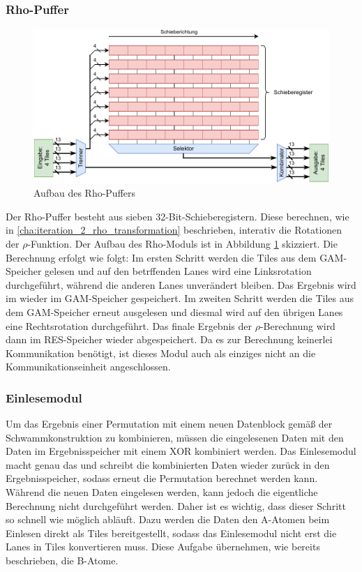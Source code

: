 \subsubsection{Rho-Puffer}
\begin{figure}
	\center
	\includegraphics{images/Rho-Aufbau.pdf}
	\caption{Aufbau des Rho-Puffers}
	\label{fig:rho_aufbau_iteration_3}
\end{figure}
Der Rho-Puffer besteht aus sieben 32-Bit-Schieberegistern. Diese berechnen, wie in \ref{cha:iteration_2_rho_transformation} beschrieben,
interativ die Rotationen der $\rho$-Funktion. Der Aufbau des Rho-Moduls ist in Abbildung \ref{fig:rho_aufbau_iteration_3} skizziert.
Die Berechnung erfolgt wie folgt: Im ersten Schritt werden die Tiles aus dem GAM-Speicher gelesen und auf den betrffenden Lanes
wird eine Linksrotation durchgeführt, während die anderen Lanes unverändert bleiben. Das Ergebnis wird im wieder im GAM-Speicher gespeichert.
Im zweiten Schritt werden die Tiles aus dem GAM-Speicher erneut ausgelesen und diesmal wird auf den übrigen Lanes eine Rechtsrotation durchgeführt.
Das finale Ergebnis der $\rho$-Berechnung wird dann im RES-Speicher wieder abgespeichert. Da es zur Berechnung keinerlei Kommunikation benötigt,
ist dieses Modul auch als einziges nicht an die Kommunikationseinheit angeschlossen.

\subsubsection{Einlesemodul}
Um das Ergebnis einer Permutation mit einem neuen Datenblock gemäß der Schwammkonstruktion zu kombinieren, müssen die eingelesenen Daten
mit den Daten im Ergebnisspeicher mit einem XOR kombiniert werden. Das Einlesemodul macht genau das und schreibt die kombinierten Daten
wieder zurück in den Ergebnisspeicher, sodass erneut die Permutation berechnet werden kann. Während die neuen Daten eingelesen werden,
kann jedoch die eigentliche Berechnung nicht durchgeführt werden. Daher ist es wichtig, dass dieser Schritt so schnell wie möglich abläuft.
Dazu werden die Daten den A-Atomen beim Einlesen direkt als Tiles bereitgestellt, sodass das Einlesemodul nicht erst die Lanes in Tiles konvertieren muss.
Diese Aufgabe übernehmen, wie bereits beschrieben, die B-Atome.

